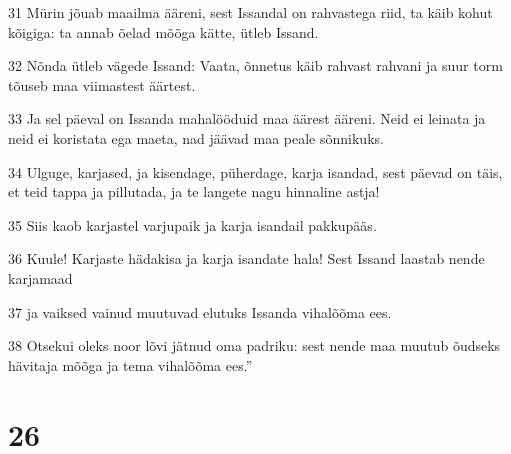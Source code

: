 \par 31 Mürin jõuab maailma ääreni, sest Issandal on rahvastega riid, ta käib kohut kõigiga: ta annab õelad mõõga kätte, ütleb Issand.
\par 32 Nõnda ütleb vägede Issand: Vaata, õnnetus käib rahvast rahvani ja suur torm tõuseb maa viimastest äärtest.
\par 33 Ja sel päeval on Issanda mahalööduid maa äärest ääreni. Neid ei leinata ja neid ei koristata ega maeta, nad jäävad maa peale sõnnikuks.
\par 34 Ulguge, karjased, ja kisendage, püherdage, karja isandad, sest päevad on täis, et teid tappa ja pillutada, ja te langete nagu hinnaline astja!
\par 35 Siis kaob karjastel varjupaik ja karja isandail pakkupääs.
\par 36 Kuule! Karjaste hädakisa ja karja isandate hala! Sest Issand laastab nende karjamaad
\par 37 ja vaiksed vainud muutuvad elutuks Issanda vihalõõma ees.
\par 38 Otsekui oleks noor lõvi jätnud oma padriku: sest nende maa muutub õudseks hävitaja mõõga ja tema vihalõõma ees.”

\chapter{26}

